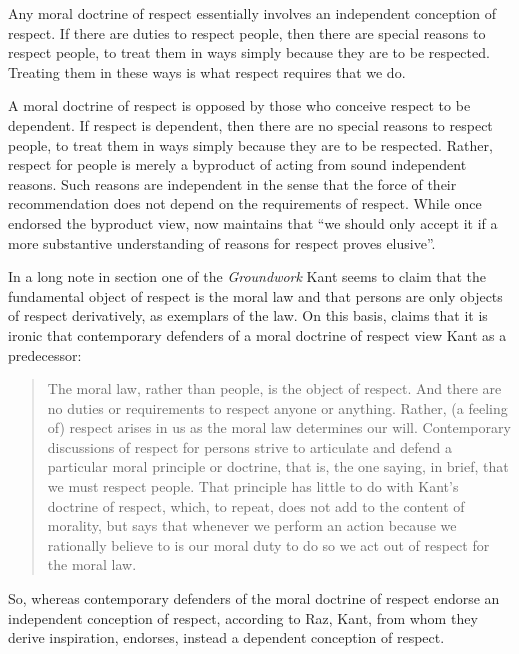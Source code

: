 \documentclass[12pt]{article}
\begin{document}
Any moral doctrine of respect essentially involves an independent conception of respect. If there are duties to respect people, then there are special reasons to respect people, to treat them in ways simply because they are to be respected. Treating them in these ways is what respect requires that we do. 

A moral doctrine of respect is opposed by those who conceive respect to be dependent. If respect is dependent, then there are no special reasons to respect people, to treat them in ways simply because they are to be respected. Rather, respect for people is merely a byproduct of acting from sound independent reasons. Such reasons are independent in the sense that the force of their recommendation does not depend on the requirements of respect. While \citet{Raz:1986lq} once endorsed the byproduct view, \citet[127]{Raz:2001ps} now maintains that ``we should only accept it if a more substantive understanding of reasons for respect proves elusive''. 

In a long note in section one of the \emph{Groundwork} Kant seems to claim that the fundamental object of respect is the moral law and that persons are only objects of respect derivatively, as exemplars of the law. On this basis, \citet[131]{Raz:2001ps} claims that it is ironic that contemporary defenders of a moral doctrine of respect view Kant as a predecessor:
\begin{quote}
	The moral law, rather than people, is the object of respect. And there are no duties or requirements to respect anyone or anything. Rather, (a feeling of) respect arises in us as the moral law determines our will. Contemporary discussions of respect for persons strive to articulate and defend a particular moral principle or doctrine, that is, the one saying, in brief, that we must respect people. That principle has little to do with Kant's doctrine of respect, which, to repeat, does not add to the content of morality, but says that whenever we perform an action because we rationally believe to is our moral duty to do so we act out of respect for the moral law. \citep[134]{Raz:2001ps}
\end{quote}
So, whereas contemporary defenders of the moral doctrine of respect endorse an independent conception of respect, according to Raz, Kant, from whom they derive inspiration, endorses, instead a dependent conception of respect.
\end{document}
